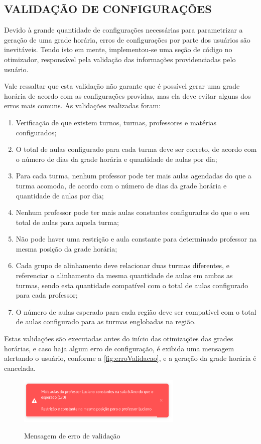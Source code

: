 \subsection{VALIDAÇÃO DE CONFIGURAÇÕES}

Devido à grande quantidade de configurações necessárias para parametrizar a geração de uma grade horária, erros de configurações por parte dos usuários são inevitáveis. Tendo isto em mente, implementou-se uma seção de código no otimizador, responsável pela validação das informações providenciadas pelo usuário.

Vale ressaltar que esta validação não garante que é possível gerar uma grade horária de acordo com as configurações providas, mas ela deve evitar alguns dos erros mais comuns. As validações realizadas foram:

\begin{enumerate}
	\item Verificação de que existem turnos, turmas, professores e matérias configurados;
	\item O total de aulas configurado para cada turma deve ser correto, de acordo com o número de dias da grade horária e quantidade de aulas por dia;
	\item Para cada turma, nenhum professor pode ter mais aulas agendadas do que a turma acomoda, de acordo com o número de dias da grade horária e quantidade de aulas por dia;
	\item Nenhum professor pode ter mais aulas constantes configuradas do que o seu total de aulas para aquela turma;
	\item Não pode haver uma restrição e aula constante para determinado professor na mesma posição da grade horária;
	\item Cada grupo de alinhamento deve relacionar duas turmas diferentes, e referenciar o alinhamento da mesma quantidade de aulas em ambas as turmas, sendo esta quantidade compatível com o total de aulas configurado para cada professor;
	\item O número de aulas esperado para cada região deve ser compatível com o total de aulas configurado para as turmas englobadas na região.
\end{enumerate}

Estas validações são executadas antes do início das otimizações das grades horárias, e caso haja algum erro de configuração, é exibida uma mensagem alertando o usuário, conforme a \autoref{fig:erroValidacao}, e a geração da grade horária é cancelada.

\begin{figure}[h]
	\centering
	\caption{Mensagem de erro de validação}
	\includegraphics[width=0.7\textwidth]{./dados/figuras/erroValidacao}
	\label{fig:erroValidacao}
\end{figure}
\pagebreak
